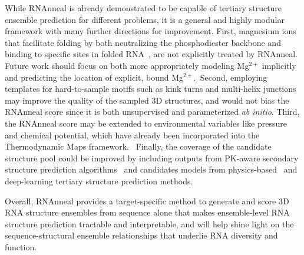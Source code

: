 While RNAnneal is already demonstrated to be capable of tertiary structure ensemble prediction for different problems, it is a general and highly modular framework with many further directions for improvement. First, magnesium ions that facilitate folding by both neutralizing the phosphodiester backbone and binding to specific sites in folded RNA~\cite{brion1997hierarchy}, are not explicitly treated by RNAnneal. Future work should focus on both more appropriately modeling Mg$^\mathrm{2+}$ implicitly and predicting the location of explicit, bound Mg$^\mathrm{2+}$.~\cite{yamagami2021functional}Second, employing templates for hard-to-sample motifs such as kink turns and multi-helix junctions~\cite{sarver2008fr3d,laing2009analysis,roll2016jar3d} may improve the quality of the sampled 3D structures, and would not bias the RNAnneal score since it is both unsupervised and parameterized {\it ab initio}. Third, the RNAnneal score may be extended to environmental variables like pressure and chemical potential, which have already been incorporated into the Thermodynamic Maps framework.~\cite{exptm} Finally, the coverage of the candidate structure pool could be improved by including outputs from PK-aware secondary structure prediction algorithms~\cite{xu2014vfold,xu2015physics,kim2015computational,xiong2021pairing,li2023rnajp} and candidates models from physics-based~\cite{xiong2021pairing,li2022vfold,li2023rnajp,watkins2018blind} and deep-learning \cite{alphafold-3,chai2024chai,wohlwend2025boltz, baek2024accurate} tertiary structure prediction methods.

Overall, RNAnneal provides a target-specific method to generate and score 3D RNA structure ensembles from sequence alone that makes ensemble-level RNA structure prediction tractable and interpretable, and will help shine light on the sequence-structural ensemble relationships that underlie RNA diversity and function.
